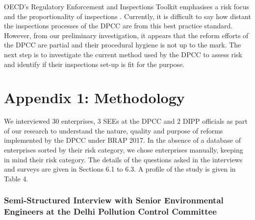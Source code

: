 \documentclass[a4paper, 12pt]{article}
\begin{document}
	OECD’s Regulatory Enforcement and Inspections Toolkit emphasises a risk focus and the proportionality of inspections \parencite{OECD18}. Currently, it is difficult to say how distant the inspections processes of the DPCC are from this best practice standard. However, from our preliminary investigation, it appears that the reform efforts of the DPCC are partial and their procedural hygiene is not up to the mark. The next step is to investigate the current method used by the DPCC to assess risk and identify if their inspections set-up is fit for the purpose. 
	
	\printbibliography[title={Bibliography}]
	\newpage
		\section*{Appendix 1: Methodology}
		\footnotesize
		We interviewed 30 enterprises, 3 SEEs at the DPCC and 2 DIPP officials as part of our research to understand the nature, quality and purpose of reforms implemented by the DPCC under BRAP 2017. In the absence of a database of enterprises sorted by their risk category, we chose enterprises manually, keeping in mind their risk category. The details of the questions asked in the interviews and surveys are given in Sections 6.1 to 6.3. A profile of the study is given in Table 4. 
		\small
		
		
		\subsubsection*{Semi-Structured Interview with Senior Environmental Engineers at the Delhi Pollution Control Committee}
		
\end{document}
